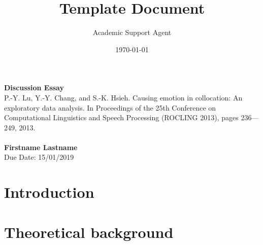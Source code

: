 \documentclass{article}
\title{Template Document}
\author{Academic Support Agent}
\date{\today}
\begin{document}
\maketitle

\noindent
\large\textbf{Discussion Essay} \\  
\normalsize P.-Y. Lu, Y.-Y. Chang, and S.-K. Hsieh.  Causing emotion in collocation:  An exploratory data analysis. In Proceedings of the 25th Conference on Computational Linguistics and Speech Processing (ROCLING 2013), pages 236---249, 2013.
\\ \\
\textbf{Firstname Lastname} \\
\normalsize   Due Date: 15/01/2019


\section*{Introduction}
\lipsum[1]

\section*{Theoretical background}
\lipsum[2]
\cite{lu2013causing}






\end{document}
